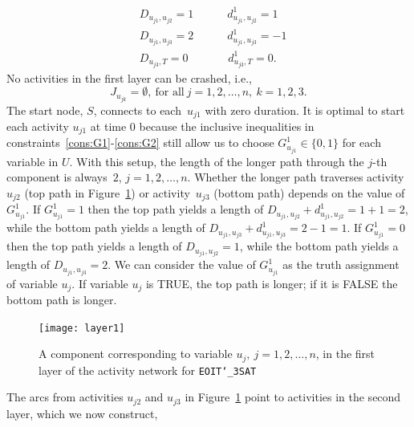 \documentclass[11pt]{article}
\newcommand{\noi}{\noindent}
\newcommand{\tcr}{\textcolor{red}}
\begin{document}
	\begin{subequations}\label{eqn:first_layer}
		\begin{align}
		& D_{u_{j1},u_{j2}} = 1 \qquad \quad d^1_{u_{j1},u_{j2}} = 1\\
		& D_{u_{j1},u_{j3}} = 2 \qquad \quad d^1_{u_{j1},u_{j3}} = -1  \\
		& D_{u_{j3},T} = 0 \qquad \quad \;\; d^1_{u_{j3},T} = 0.
		\end{align}
	\end{subequations}
	No activities in the first layer can be crashed, i.e., 
	\begin{equation}\label{eqn:first_layer_crash}	
	J_{u_{jk}} = \emptyset, \ \mbox{for all} \  j = 1,2,\dots, n,\ k = 1,2,3.
	\end{equation}	
	The start node, $S$, connects to each~$u_{j1}$ with zero duration. It is optimal to start each activity \(u_{j1}\) at time \(0\) because the inclusive inequalities in constraints~\eqref{cons:G1}-\eqref{cons:G2} still allow us to choose \(G^1_{u_{j1}}  \in \{0,1\}\) for each variable in $U$. With this setup, the length of the longer path through the \(j\)-th component is always~\(2\), \(j = 1,2,\dots,n\). Whether the longer path traverses activity~\(u_{j2}\) (top path in Figure~\ref{fig:layer1}) or activity~\(u_{j3}\) (bottom path) depends on the value of \(G^1_{u_{j1}}\). 
	If \(G^1_{u_{j1}} = 1\) then the top path yields a length of \(D_{u_{j1},u_{j2}} + d^1_{u_{j1},u_{j2}} = 1 + 1 = 2\), while the bottom path yields a length of \(D_{u_{j1},u_{j3}} + d^1_{u_{j1},u_{j3}} = 2 - 1 = 1\). If \(G^1_{u_{j1}} = 0\) 
	then the top path yields a length of \(D_{u_{j1},u_{j2}} = 1\), while the bottom path yields a length of \(D_{u_{j1},u_{j3}} = 2\). We can consider the value of \(G^1_{u_{j1}}\) as the truth assignment of variable \(u_j\). If variable \(u_j\) is TRUE, the top path is longer; if it is FALSE the bottom path is longer. 
	\begin{figure}[H]
		\centering
		\texttt{[image: layer1]}
		\caption{A component corresponding to variable \(u_j,\ j = 1,2,\dots, n\), in the first layer of the activity network for \texttt{EOIT\char`_3SAT}}
		\label{fig:layer1}
	\end{figure}
	\noi The arcs from activities \(u_{j2}\) and \(u_{j3}\) in Figure~\ref{fig:layer1} point to activities in the second layer, which we now construct, 
\end{document}
